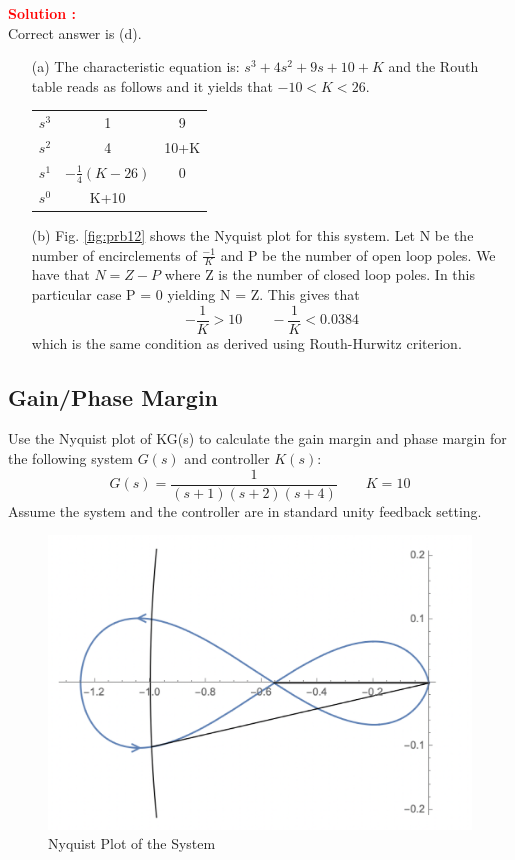 \documentclass[12pt]{article}
\begin{document}
\textbf{\textcolor{red}{Solution :}} \\
Correct answer is (d).\\
\begin{itemize}
    \item [(a)] The characteristic equation is: $s^3 + 4s^2 + 9s + 10 + K$ and the Routh table reads as follows and it yields that $-10 < K < 26$.
    \begin{table}[h!]
        \centering
        \begin{tabular}{c c c}
            $s^3$ &  1 & 9 \\
            $s^2$ &  4 & 10+K\\
            $s^1$ &  $-\frac{1}{4}(K-26)$ & 0\\
            $s^0$ & K+10 & 
        \end{tabular}
    \end{table}


    \item[(b)] Fig. \ref{fig:prb12} shows the Nyquist plot for this system. Let N be the number of encirclements of $\frac{-1}{K}$ and P be the number of open loop poles. We have that $N = Z - P$ where Z is the number of closed loop poles. In this particular case P = 0 yielding N = Z. This gives that
$$- \frac{1}{K}> 10 \qquad - \frac{1}{K}<0.0384$$
which is the same condition as derived using Routh-Hurwitz criterion.
\end{itemize}
\clearpage

\subsection{Gain/Phase Margin}

Use the Nyquist plot of KG(s) to calculate the gain margin and phase margin for the following system $G(s)$ and controller $K(s)$:
$$G(s)=\frac{1}{(s + 1)(s + 2)(s + 4)} \qquad K=10$$
Assume the system and the controller are in standard unity feedback setting. \\

\begin{figure}[h!]
    \centering
    \includegraphics[width=0.5\linewidth]{figs/8.4.png}
    \caption{Nyquist Plot of the System}
    \label{fig:prb13}
\end{figure}
\end{document}
